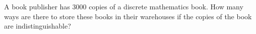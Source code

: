 \documentclass[../main.tex]{subfiles}
\begin{document}
A book publisher has 3000 copies of a discrete mathematics book. How many ways are there to store these books in their warehouses if the copies of the book are indistinguishable?

\solution
\end{document}
